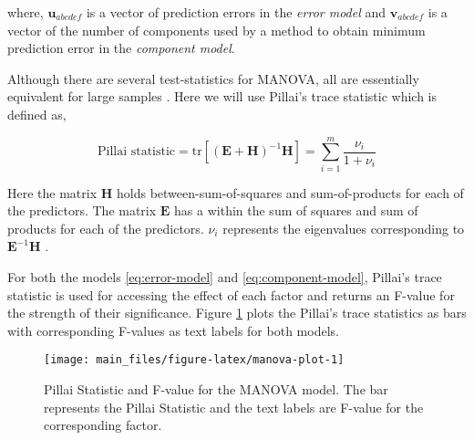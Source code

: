 \documentclass[review]{elsarticle}
\begin{document}
where, \(\mathbf{u}_{abcdef}\) is a vector of prediction errors in the
\emph{error model} and \(\mathbf{v}_{abcdef}\) is a vector of the number
of components used by a method to obtain minimum prediction error in the
\emph{component model}.

Although there are several test-statistics for MANOVA, all are
essentially equivalent for large samples \citep{johnson2018applied}.
Here we will use Pillai's trace statistic which is defined as,

\begin{equation}
\text{Pillai statistic} = \text{tr}\left[
\left(\mathbf{E} + \mathbf{H}\right)^{-1}\mathbf{H}
\right] = \sum_{i=1}^m{\frac{\nu_i}{1 + \nu_i}}
\label{eq:pillai}
\end{equation}

Here the matrix \(\mathbf{H}\) holds between-sum-of-squares and
sum-of-products for each of the predictors. The matrix \(\mathbf{E}\)
has a within the sum of squares and sum of products for each of the
predictors. \(\nu_i\) represents the eigenvalues corresponding to
\(\mathbf{E}^{-1}\mathbf{H}\) \citep{rencher2003methods}.

For both the models \eqref{eq:error-model} and \eqref{eq:component-model},
Pillai's trace statistic is used for accessing the effect of each factor
and returns an F-value for the strength of their significance. Figure
\ref{fig:manova-plot} plots the Pillai's trace statistics as bars with
corresponding F-values as text labels for both models.





\begin{figure}
\texttt{[image: main\_files/figure-latex/manova-plot-1]} \caption{Pillai Statistic and F-value for the MANOVA model. The
bar represents the Pillai Statistic and the text labels are F-value for
the corresponding factor.}\label{fig:manova-plot}
\end{figure}
\end{document}
